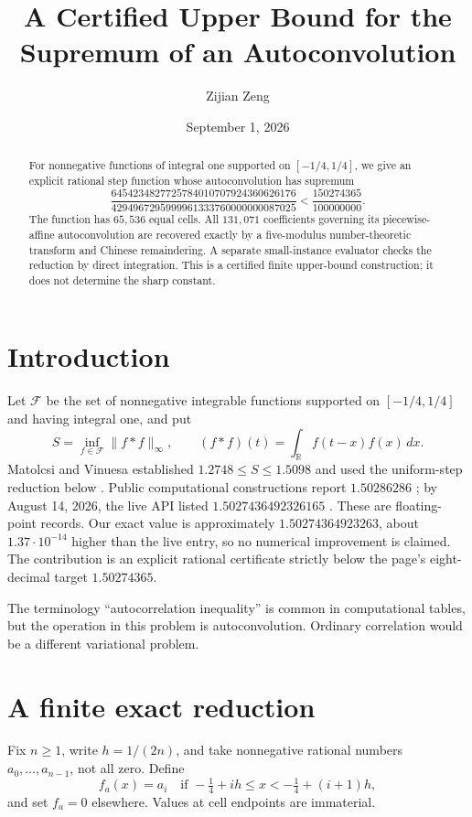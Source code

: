 \documentclass[11pt]{amsart}
\title[Certified autoconvolution upper bound]{A Certified Upper Bound for the Supremum of an Autoconvolution}
\author{Zijian Zeng}
\date{September 1, 2026}
\begin{document}
\begin{abstract}
For nonnegative functions of integral one supported on $[-1/4,1/4]$, we give
an explicit rational step function whose autoconvolution has supremum
\[
 \frac{6454234827725784010707924360626176}{4294967295999961333760000000087025}
 <\frac{150274365}{100000000}.
\]
The function has $65{,}536$ equal cells. All $131{,}071$ coefficients governing
its piecewise-affine autoconvolution are recovered exactly by a five-modulus
number-theoretic transform and Chinese remaindering. A separate small-instance
evaluator checks the reduction by direct integration. This is a certified
finite upper-bound construction; it does not determine the sharp constant.
\end{abstract}
\maketitle

\section{Introduction}
Let $\mathcal F$ be the set of nonnegative integrable functions supported on
$[-1/4,1/4]$ and having integral one, and put
\[
 S=\inf_{f\in\mathcal F}\|f*f\|_\infty,
 \qquad (f*f)(t)=\int_{\mathbb R}f(t-x)f(x)\,dx.
\]
Matolcsi and Vinuesa established $1.2748\le S\le1.5098$ and used the
uniform-step reduction below
\cite[Eq.~(1), Section~4, and Eq.~(13)]{MV2010}.
Public computational constructions report $1.50286286$ \cite{ArenaSOTA}; by
August 14, 2026, the live API listed $1.5027436492326165$ \cite{ArenaLive}.
These are floating-point records. Our exact value is approximately
$1.50274364923263$, about $1.37\mathbin{\cdot}10^{-14}$ higher than the live
entry, so no numerical improvement is claimed. The contribution is an
explicit rational certificate strictly below the page's eight-decimal target
$1.50274365$.

The terminology ``autocorrelation inequality'' is common in computational
tables, but the operation in this problem is autoconvolution. Ordinary
correlation would be a different variational problem.

\section{A finite exact reduction}
Fix $n\ge1$, write $h=1/(2n)$, and take nonnegative rational numbers
$a_0,\ldots,a_{n-1}$, not all zero. Define
\[
 f_a(x)=a_i\quad\text{if }-\tfrac14+ih\le x< -\tfrac14+(i+1)h,
\]
and set $f_a=0$ elsewhere. Values at cell endpoints are immaterial.
\end{document}
